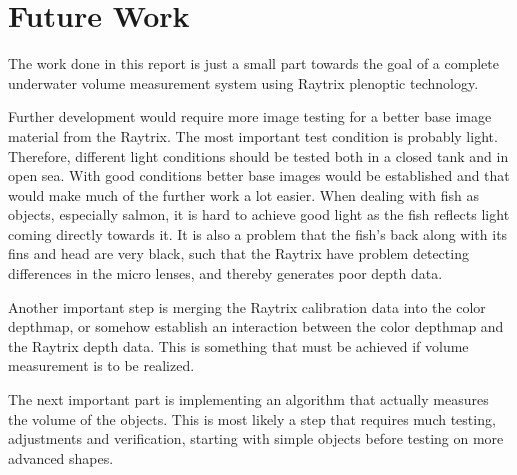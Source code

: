 \section{Future Work} \label{future_work}

The work done in this report is just a small part towards the goal of a complete underwater volume measurement system using Raytrix plenoptic technology. 

Further development would require more image testing for a better base image material from the Raytrix. The most important test condition is probably light. Therefore, different light conditions should be tested both in a closed tank and in open sea. With good conditions better base images would be established and that would make much of the further work a lot easier. 
When dealing with fish as objects, especially salmon, it is hard to achieve good light as the fish reflects light coming directly towards it. It is also a problem that the fish's back along with its fins and head are very black, such that the Raytrix have problem detecting differences in the micro lenses, and thereby generates poor depth data.

Another important step is merging the Raytrix calibration data into the color depthmap, or somehow establish an interaction between the color depthmap and the Raytrix depth data. This is something that must be achieved if volume measurement is to be realized.

The next important part is implementing an algorithm that actually measures the volume of the objects. This is most likely a step that requires much testing, adjustments and verification, starting with simple objects before testing on more advanced shapes. 

